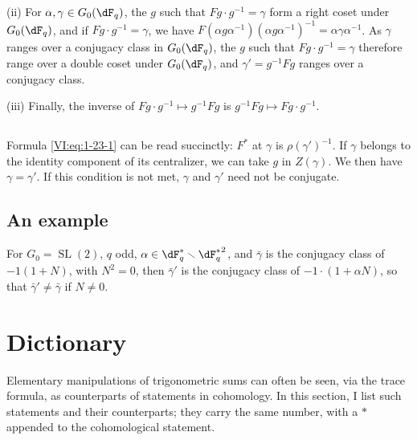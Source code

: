\documentclass[oneside]{book}
\renewcommand{\setminus}{\smallsetminus}
\theoremstyle{sga-source}
\theoremstyle{sga-source-dash}
\theoremstyle{sga-source-dotdash}
\theoremstyle{sga-source-number-note-dash}
\theoremstyle{sga-source-note-number-dotdash}
\theoremstyle{sga-source-example-dotdash}
\theoremstyle{sga-source-inline-number}
\theoremstyle{sga-source-bare-number}
\theoremstyle{sga-source}
\newcommand{\PrintPage}[1]{}\newcommand{\MathPage}[1]{}\newcommand{\PrintCite}[2]{#1}\newcommand{\var}[3]{#2}
\begin{document}
(ii) For $\alpha,\gamma\in G_0(\dF_q)$, the $g$ such that 
$F g\cdot g^{-1} = \gamma$ form a right coset under $G_0(\dF_q)$, and 
if $F g\cdot g^{-1} = \gamma$, we have 
$F(\alpha g \alpha^{-1})(\alpha g \alpha^{-1})^{-1} = \alpha \gamma\alpha^{-1}$. 
As $\gamma$ ranges over a conjugacy class in $G_0(\dF_q)$, the $g$ 
such that $F g\cdot g^{-1} = \gamma$ therefore range over a double coset under 
$G_0(\dF_q)$, and $\gamma'= g^{-1} F g$ ranges over a conjugacy class. 

(iii) Finally, the inverse of $F g\cdot g^{-1}\mapsto g^{-1} F g$ is 
$g^{-1} F g\mapsto F g\cdot g^{-1}$. 





\subsection{}\label{VI:1-25}

Formula \eqref{VI:eq:1-23-1} can be read succinctly: $F^\ast$ at 
$\gamma$ is $\rho(\gamma')^{-1}$. If $\gamma$ belongs to the identity component 
of its centralizer, we can take $g$ in $Z(\gamma)$. We then have 
$\gamma=\gamma'$. If this condition is not met, $\gamma$ and $\gamma'$ 
need not be conjugate. 





\subsection{An example}\label{VI:1-26}

For $G_0=\operatorname{SL}(2)$, $q$ odd, 
$\alpha\in \dF_q^\ast\setminus {\dF_q^\ast}^2$, and $\bar\gamma$ is the 
conjugacy class of $-1(1+N)$, with $N^2=0$, then $\bar\gamma'$ is the 
conjugacy class of $-1\cdot (1+\alpha N)$, so that $\bar\gamma'\ne \bar\gamma$ 
if $N\ne 0$. 










\PrintPage{183}
\section{Dictionary}\label{VI:2}

Elementary manipulations of trigonometric sums can often 
be seen, via the trace formula, as counterparts of statements 
in cohomology. In this section, I list such statements and their 
counterparts; they carry the same number, with a $\ast$ appended to 
the cohomological statement. 
\end{document}
